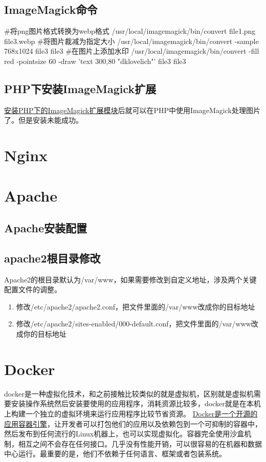 \subsection{ImageMagick命令}
\begin{shell}
#将png图片格式转换为webp格式
/usr/local/imagemagick/bin/convert file1.png file3.webp
#将图片裁减为指定大小
/usr/local/imagemagick/bin/convert -sample 768x1024 file3 file3
#在图片上添加水印
/usr/local/imagemagick/bin/convert -fill red -pointsize 60 -draw 'text 300,80 "dklovelich"' file3 file3
\end{shell}
\subsection{PHP下安装ImageMagick扩展}
\href{https://blog.csdn.net/JineD/article/details/108318106?spm=1001.2014.3001.5506}{安装PHP下的ImageMagick扩展模块}后就可以在PHP中使用ImageMagick处理图片了。但是安装未能成功。

\section{Nginx}
\section{Apache}
\subsection{Apache安装配置}
\subsection{apache2根目录修改}
Apache2的根目录默认为/var/www，如果需要修改到自定义地址，涉及两个关键配置文件的调整。 
\begin{enumerate}
	\item 修改/etc/apache2/apache2.conf，把文件里面的/var/www改成你的目标地址
	\item 修改/etc/apache2/sites-enabled/000-default.conf，把文件里面的/var/www改成你的目标地址
\end{enumerate}
\section{Docker}
docker是一种虚拟化技术，和之前接触比较类似的就是虚拟机，区别就是虚拟机需要安装操作系统然后安装要使用的应用程序，消耗资源比较多，docker就是在本机上构建一个独立的虚拟环境来运行应用程序比较节省资源。
\href{https://blog.csdn.net/m0_61503020/article/details/125456520?spm=1001.2014.3001.5506}{Docker是一个开源的应用容器引擎}，让开发者可以打包他们的应用以及依赖包到一个可抑制的容器中，然后发布到任何流行的Linux机器上，也可以实现虚拟化。容器完全使用沙盒机制，相互之间不会存在任何接口。几乎没有性能开销，可以很容易的在机器和数据中心运行。最重要的是，他们不依赖于任何语言、框架或者包装系统。
